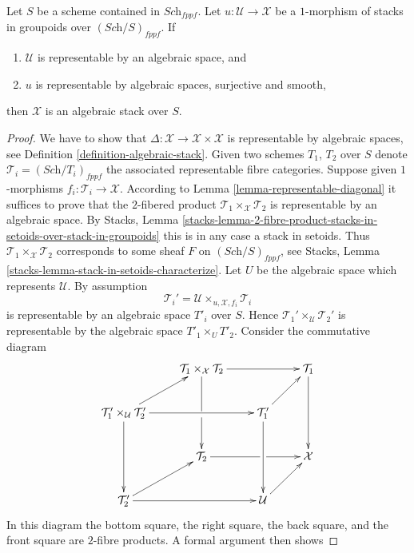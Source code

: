 \begin{lemma}
\label{lemma-smooth-surjective-morphism-implies-algebraic}
Let $S$ be a scheme contained in $\textit{Sch}_{fppf}$.
Let $u : \mathcal{U} \to \mathcal{X}$ be a $1$-morphism of
stacks in groupoids over $(\textit{Sch}/S)_{fppf}$. If
\begin{enumerate}
\item $\mathcal{U}$ is representable by an algebraic space, and
\item $u$ is representable by algebraic spaces, surjective and smooth,
\end{enumerate}
then $\mathcal X$ is an algebraic stack over $S$. 
\end{lemma}

\begin{proof}
We have to show that $\Delta : \mathcal{X} \to \mathcal{X} \times \mathcal{X}$
is representable by algebraic spaces, see
Definition \ref{definition-algebraic-stack}.
Given two schemes $T_1$, $T_2$ over $S$ denote
$\mathcal{T}_i = (\textit{Sch}/T_i)_{fppf}$ the associated representable
fibre categories. Suppose given $1$-morphisms
$f_i : \mathcal{T}_i \to \mathcal{X}$.
According to
Lemma \ref{lemma-representable-diagonal}
it suffices to prove that the $2$-fibered
product $\mathcal{T}_1 \times_{\mathcal{X}} \mathcal{T}_2$
is representable by an algebraic space. By
Stacks, Lemma
\ref{stacks-lemma-2-fibre-product-stacks-in-setoids-over-stack-in-groupoids}
this is in any case a stack in setoids. Thus
$\mathcal{T}_1 \times_{\mathcal{X}} \mathcal{T}_2$ corresponds
to some sheaf $F$ on $(\textit{Sch}/S)_{fppf}$, see
Stacks, Lemma \ref{stacks-lemma-stack-in-setoids-characterize}.
Let $U$ be the algebraic space which represents $\mathcal{U}$.
By assumption
$$
\mathcal{T}_i' = \mathcal{U} \times_{u, \mathcal{X}, f_i} \mathcal{T}_i
$$
is representable by an algebraic space $T'_i$ over $S$. Hence
$\mathcal{T}_1' \times_\mathcal{U} \mathcal{T}_2'$ is representable
by the algebraic space $T'_1 \times_U T'_2$.
Consider the commutative diagram
$$
\xymatrix{
&
\mathcal{T}_1 \times_{\mathcal X} \mathcal{T}_2 \ar[rr]\ar'[d][dd] & &
\mathcal{T}_1 \ar[dd] \\ 
\mathcal{T}_1' \times_\mathcal{U} \mathcal{T}_2' \ar[ur]\ar[rr]\ar[dd] & &
\mathcal{T}_1' \ar[ur]\ar[dd] \\ 
&
\mathcal{T}_2 \ar'[r][rr] & &
\mathcal X \\ 
\mathcal{T}_2' \ar[rr]\ar[ur] & &
\mathcal{U} \ar[ur] }
$$
In this diagram the bottom square, the right square, the back square, and
the front square are $2$-fibre products. A formal argument then shows

\end{proof}

